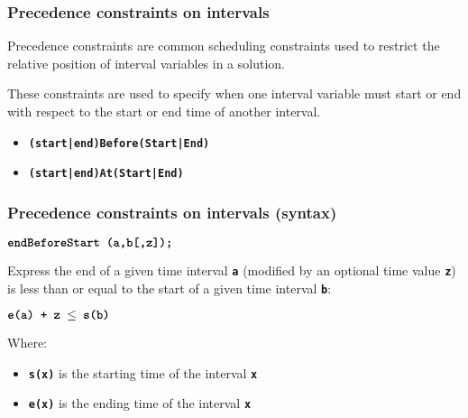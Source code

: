 \begin{frame} \frametitle{Precedence constraints on intervals}

Precedence constraints are common scheduling constraints used to restrict the relative position of interval variables in a solution.

\pause\medskip

These constraints are used to specify when one interval variable must start or end with respect to the start or end time of another interval.\pause
\begin{itemize}[<+->]
\item \textbf{\texttt{(start|end)Before(Start|End)}}
\item \textbf{\texttt{(start|end)At(Start|End)}}
\end{itemize}

\end{frame}

\begin{frame} \frametitle{Precedence constraints on intervals (syntax)}

$\textbf{\texttt{endBeforeStart (a,b[,z]);}}$

\pause\medskip

Express the end of a given time interval \textbf{\texttt{a}} (modified by an optional time value \textbf{\texttt{z}}) is less than or equal to the start of a given time interval \textbf{\texttt{b}}:

\pause\medskip 

$\textbf{\texttt{e(a) + z $\leq$ s(b)}}$

\pause\medskip

Where:\pause
\begin{itemize}[<+->]
	\item \textbf{\texttt{s(x)}} is the starting time of the interval \textbf{\texttt{x}}
	\item \textbf{\texttt{e(x)}} is the ending time of the interval \textbf{\texttt{x}}
\end{itemize}

\end{frame}


